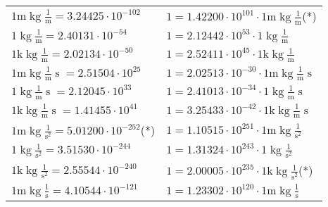 \begin{center}
\begin{longtable}{l l}
{\color{gray}$1 \bm{\mathrm{ m}}\operatorname{kg}\frac1{\operatorname{m}}{}{}{} = 3.24425\cdot10^{-102} $}   & {\color{gray}$ 1 = 1.42200\cdot10^{101} \cdot 1 \bm{\mathrm{ m}}\operatorname{kg}\frac1{\operatorname{m}}{}{}{}$}\quad(*)\\
{\color{black}$1 \bm{\mathrm{ }}\operatorname{kg}\frac1{\operatorname{m}}{}{}{} = 2.40131\cdot10^{-54} $}   & {\color{black}$ 1 = 2.12442\cdot10^{53} \cdot 1 \bm{\mathrm{ }}\operatorname{kg}\frac1{\operatorname{m}}{}{}{}$}  \\
{\color{gray}$1 \bm{\mathrm{ k}}\operatorname{kg}\frac1{\operatorname{m}}{}{}{} = 2.02134\cdot10^{-50} $}   & {\color{gray}$ 1 = 2.52411\cdot10^{45} \cdot 1 \bm{\mathrm{ k}}\operatorname{kg}\frac1{\operatorname{m}}{}{}{}$}  \\
{\color{gray}$1 \bm{\mathrm{ m}}\operatorname{kg}\frac1{\operatorname{m}}{\operatorname{s}}{}{} = 2.51504\cdot10^{25} $}   & {\color{gray}$ 1 = 2.02513\cdot10^{-30} \cdot 1 \bm{\mathrm{ m}}\operatorname{kg}\frac1{\operatorname{m}}{\operatorname{s}}{}{}$}  \\
{\color{black}$1 \bm{\mathrm{ }}\operatorname{kg}\frac1{\operatorname{m}}{\operatorname{s}}{}{} = 2.12045\cdot10^{33} $}   & {\color{black}$ 1 = 2.41013\cdot10^{-34} \cdot 1 \bm{\mathrm{ }}\operatorname{kg}\frac1{\operatorname{m}}{\operatorname{s}}{}{}$}  \\
{\color{gray}$1 \bm{\mathrm{ k}}\operatorname{kg}\frac1{\operatorname{m}}{\operatorname{s}}{}{} = 1.41455\cdot10^{41} $}   & {\color{gray}$ 1 = 3.25433\cdot10^{-42} \cdot 1 \bm{\mathrm{ k}}\operatorname{kg}\frac1{\operatorname{m}}{\operatorname{s}}{}{}$}  \\
{\color{gray}$1 \bm{\mathrm{ m}}\operatorname{kg}{}\frac1{\operatorname{s}^2}{}{} = 5.01200\cdot10^{-252} $}\quad(*) & {\color{gray}$ 1 = 1.10515\cdot10^{251} \cdot 1 \bm{\mathrm{ m}}\operatorname{kg}{}\frac1{\operatorname{s}^2}{}{}$}  \\
{\color{black}$1 \bm{\mathrm{ }}\operatorname{kg}{}\frac1{\operatorname{s}^2}{}{} = 3.51530\cdot10^{-244} $}   & {\color{black}$ 1 = 1.31324\cdot10^{243} \cdot 1 \bm{\mathrm{ }}\operatorname{kg}{}\frac1{\operatorname{s}^2}{}{}$}  \\
{\color{gray}$1 \bm{\mathrm{ k}}\operatorname{kg}{}\frac1{\operatorname{s}^2}{}{} = 2.55544\cdot10^{-240} $}   & {\color{gray}$ 1 = 2.00005\cdot10^{235} \cdot 1 \bm{\mathrm{ k}}\operatorname{kg}{}\frac1{\operatorname{s}^2}{}{}$}\quad(*)\\
{\color{gray}$1 \bm{\mathrm{ m}}\operatorname{kg}{}\frac1{\operatorname{s}}{}{} = 4.10544\cdot10^{-121} $}   & {\color{gray}$ 1 = 1.23302\cdot10^{120} \cdot 1 \bm{\mathrm{ m}}\operatorname{kg}{}\frac1{\operatorname{s}}{}{}$}  \\

\end{longtable}
\end{center}
